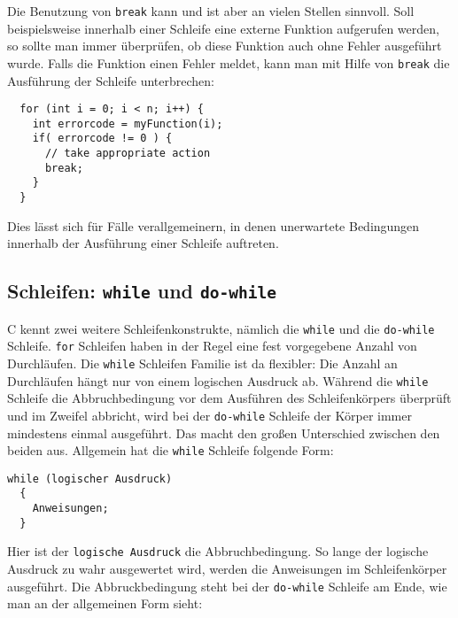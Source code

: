 Die Benutzung von \verb|break| kann und ist aber an vielen Stellen sinnvoll.
Soll beispielsweise innerhalb einer Schleife eine externe Funktion aufgerufen werden, so sollte man immer überprüfen, ob diese Funktion auch ohne Fehler ausgeführt wurde.
Falls die Funktion einen Fehler meldet, kann man mit Hilfe von \verb|break| die Ausführung der Schleife unterbrechen:

\begin{minipage}{\linewidth}
\begin{lstlisting}
  for (int i = 0; i < n; i++) {
    int errorcode = myFunction(i);
    if( errorcode != 0 ) {
      // take appropriate action
      break;
    }
  }
\end{lstlisting}
\end{minipage}
Dies lässt sich für Fälle verallgemeinern, in denen unerwartete Bedingungen innerhalb der Ausführung einer Schleife auftreten.

\subsection{Schleifen: \texttt{while} und \texttt{do-while}}

C kennt zwei weitere Schleifenkonstrukte, nämlich die \verb|while| und die \verb|do-while| Schleife.
\texttt{for} Schleifen haben in der Regel eine fest vorgegebene Anzahl von Durchläufen.
Die \texttt{while} Schleifen Familie ist da flexibler: Die Anzahl an Durchläufen hängt nur von einem logischen Ausdruck ab.
Während die \verb|while| Schleife die Abbruchbedingung vor dem Ausführen des Schleifenkörpers überprüft und im Zweifel abbricht, wird bei der \verb|do-while| Schleife der Körper immer mindestens einmal ausgeführt.
Das macht den großen Unterschied zwischen den beiden aus.
Allgemein hat die \verb|while| Schleife folgende Form:

\begin{minipage}{\linewidth}
\begin{lstlisting}[caption={while Schleife}, belowcaptionskip=0.3em]
while (logischer Ausdruck)
  {
    Anweisungen;
  }
\end{lstlisting}
\end{minipage}
Hier ist der \texttt{logische Ausdruck} die Abbruchbedingung.
So lange der logische Ausdruck zu wahr ausgewertet wird, werden die Anweisungen im Schleifenkörper ausgeführt.
Die Abbruckbedingung steht bei der \verb|do-while| Schleife am Ende, wie man an der allgemeinen Form sieht:


